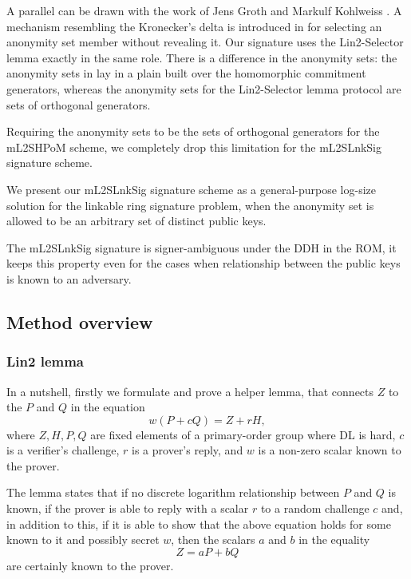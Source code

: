\documentclass{mathcryptology} %
\theoremstyle{title}
\theoremstyle{titleof}
\begin{document}
    A parallel can be drawn with the work of Jens Groth and Markulf Kohlweiss \cite{9}. A mechanism resembling the Kronecker's delta is introduced in \cite{9} for selecting an anonymity set member without revealing it. Our signature uses the Lin2-Selector lemma exactly in the same role. There is a difference in the anonymity sets: the anonymity sets in \cite{9} lay in a plain built over the homomorphic commitment generators, whereas the anonymity sets for the Lin2-Selector lemma protocol are sets of orthogonal generators.

    Requiring the anonymity sets to be the sets of orthogonal generators for the mL2SHPoM scheme, we completely drop this limitation for the mL2SLnkSig signature scheme.

    We present our mL2SLnkSig signature scheme as a general-purpose log-size solution for the linkable ring signature problem, when the anonymity set is allowed to be an arbitrary set of distinct public keys.

    The mL2SLnkSig signature is signer-ambiguous under the DDH in the ROM, it keeps this property even for the cases when relationship between the public keys is known to an adversary.


\subsection{Method overview}

\subsubsection{Lin2 lemma}
    In a nutshell, firstly we formulate and prove a helper lemma, that connects $Z$ to the $P$ and $Q$ in the equation
    \begin{equation*}
        w(P+cQ)=Z+rH,
    \end{equation*}     
    where $Z, H, P, Q$ are fixed elements of a primary-order group where DL is hard, $c$ is a verifier's challenge, $r$ is a prover's reply, and $w$ is a non-zero scalar known to the prover.
    
    The lemma states that if no discrete logarithm relationship between $P$ and $Q$ is known, if the prover is able to reply with a scalar $r$ to a random challenge $c$ and, in addition to this, if it is able to show that the above equation holds for some known to it and possibly secret $w$, then the scalars $a$ and $b$ in the equality
    \begin{equation*}
        Z=aP+bQ
    \end{equation*}
    are certainly known to the prover.
\end{document}
